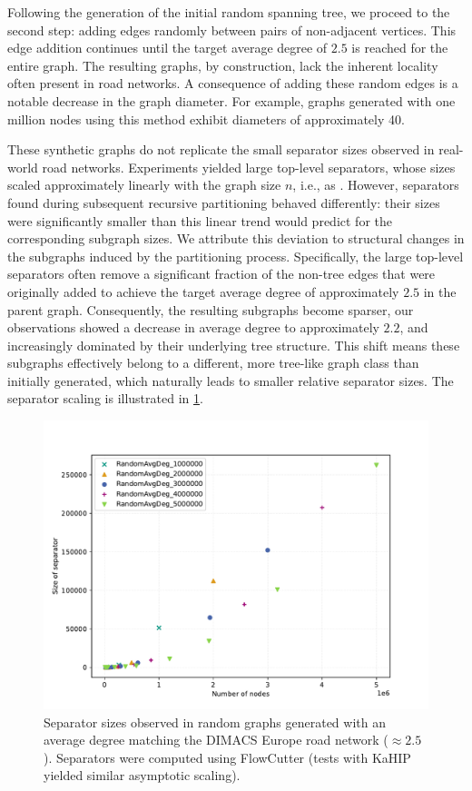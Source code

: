 Following the generation of the initial random spanning tree, we proceed to the second step: adding edges randomly between pairs of non-adjacent vertices.
This edge addition continues until the target average degree of \(2.5\) is reached for the entire graph.
The resulting graphs, by construction, lack the inherent locality often present in road networks.
A consequence of adding these random edges is a notable decrease in the graph diameter.
For example, graphs generated with one million nodes using this method exhibit diameters of approximately 40.

These synthetic graphs do not replicate the small separator sizes observed in real-world road networks.
Experiments yielded large top-level separators, whose sizes scaled approximately linearly with the graph size \(n\), i.e., as .
However, separators found during subsequent recursive partitioning behaved differently: their sizes were significantly smaller than this linear trend would predict for the corresponding subgraph sizes.
We attribute this deviation to structural changes in the subgraphs induced by the partitioning process.
Specifically, the large top-level separators often remove a significant fraction of the non-tree edges that were originally added to achieve the target average degree of approximately \(2.5\) in the parent graph.
Consequently, the resulting subgraphs become sparser, our observations showed a decrease in average degree to approximately \(2.2\), and increasingly dominated by their underlying tree structure.
This shift means these subgraphs effectively belong to a different, more tree-like graph class than initially generated, which naturally leads to smaller relative separator sizes.
The separator scaling is illustrated in \cref{fig:same_degree}.



\begin{figure}[tbhp]
	\centering
	\includegraphics[width=0.6\linewidth]{graphics/RandomAvgDeg2.5.pdf}
	\caption{Separator sizes observed in random graphs generated with an average degree matching the DIMACS Europe road network (\( \approx 2.5 \)). Separators were computed using FlowCutter (tests with KaHIP yielded similar asymptotic scaling).}
	\label{fig:same_degree}
\end{figure}

